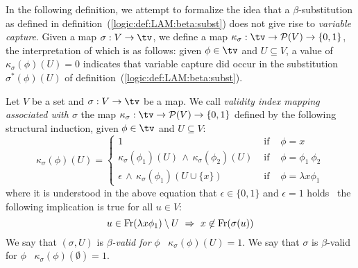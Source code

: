 In the following definition, we attempt to formalize the idea that a
$\beta$-substitution as defined in definition~(\ref{logic:def:LAM:beta:subst})
does not give rise to {\em variable capture}. Given a map $\sigma:V\to\tv$,
we define a map $\kappa_{\sigma}:\tv\to{\cal P}(V)\to\{0,1\}$, the
interpretation of which is as follows: given $\phi\in\tv$ and $U\subseteq V$, 
a value of $\kappa_{\sigma}(\phi)(U)=0$ indicates that variable capture did
occur in the substitution $\sigma^{*}(\phi)(U)$ of
definition~(\ref{logic:def:LAM:beta:subst}).
\begin{defin}\label{logic:def:LAM:beta:valid:index}
    Let $V$ be a set and $\sigma:V\to\tv$ be a map. We call {\em validity
    index mapping associated with $\sigma$} the map $\kappa_{\sigma}:\tv
    \to{\cal P}(V)\to\{0,1\}$ defined by the following structural induction,
    given $\phi\in\tv$ and $U\subseteq V$:
        \begin{equation}\label{logic:eqn:LAM:index}
            \kappa_{\sigma}(\phi)(U)=\left\{
                \begin{array}{lcl}
                    1&\mbox{\ if\ }&\phi=x\\
                    \kappa_{\sigma}(\phi_{1})(U)\,\land\,
                    \kappa_{\sigma}(\phi_{2})(U)
                    &\mbox{\ if\ }&\phi=\phi_{1}\ \phi_{2}\\
                    \epsilon\,\land\,\kappa_{\sigma}(\phi_{1})(U\cup\{x\})
                    &\mbox{\ if\ }&\phi=\lambda x\phi_{1}
            \end{array}\right.
        \end{equation} 
    where it is understood in the above equation that $\epsilon\in\{0,1\}$ 
    and $\epsilon=1$ holds \ifand\ the following implication is true 
    for all $u\in V$:
        \[
            u\in\free(\lambda x\phi_{1})\setminus U
                \ \Rightarrow\ 
            x\not\in\free(\sigma(u))
        \]
    We say that $(\sigma,U)$ is {\em $\beta$-valid for} $\phi$ \ifand\ 
    $\kappa_{\sigma}(\phi)(U)=1$. \newline
    We say that $\sigma$ is $\beta$-valid for $\phi$ \ifand\
    $\kappa_{\sigma}(\phi)(\emptyset)=1$.
\end{defin}
